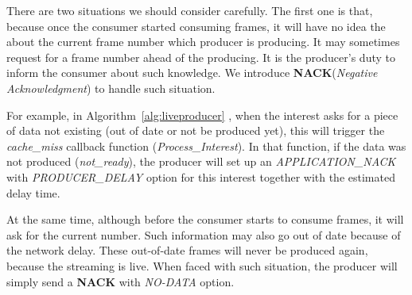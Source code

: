 There are two situations we should consider carefully. The first one is that, because once the consumer started consuming frames, it will have no idea the about the current frame number which producer is producing. It may sometimes request for a frame number ahead of the producing. It is the producer's duty to inform the consumer about such knowledge. We introduce \textbf{NACK}(\textit{Negative Acknowledgment}) to handle such situation. 

For example, in Algorithm~\ref{alg:liveproducer} , when the interest asks for a piece of data not existing (out of date or not be produced yet), this will trigger the \textit{cache\_miss} callback function (\textit{Process\_Interest}). In that function, if the data was not produced (\textit{not\_ready}), the producer will set up an \textit{APPLICATION\_NACK} with \textit{PRODUCER\_DELAY} option for this interest together with the estimated delay time.

At the same time, although before the consumer starts to consume frames, it will ask for the current number. Such information may also go out of date because of the network delay. These out-of-date frames will never be produced again, because the streaming is live. When faced with such situation, the producer will simply send a \textbf{NACK} with \textit{NO-DATA} option.


